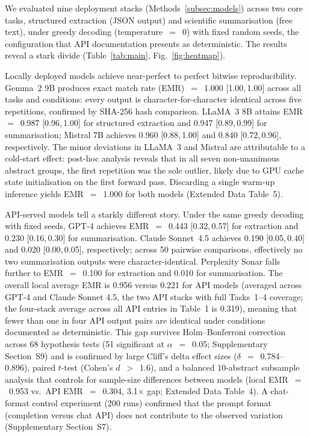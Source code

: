 \documentclass[sn-nature]{sn-jnl}
\begin{document}
We evaluated nine deployment stacks (Methods~\ref{subsec:models}) across two core tasks, structured extraction (JSON output) and scientific summarisation (free text), under greedy decoding (temperature~$=$~0) with fixed random seeds, the configuration that API documentation presents as deterministic.
The results reveal a stark divide (Table~\ref{tab:main}, Fig.~\ref{fig:heatmap}).

Locally deployed models achieve near-perfect to perfect bitwise reproducibility.
Gemma~2 9B produces exact match rate (EMR)~$=$~1.000 [1.00,\,1.00] across all tasks and conditions: every output is character-for-character identical across five repetitions, confirmed by SHA-256 hash comparison.
LLaMA~3 8B attains EMR~$=$~0.987 [0.96,\,1.00] for structured extraction and 0.947 [0.89,\,0.99] for summarisation; Mistral 7B achieves 0.960 [0.88,\,1.00] and 0.840 [0.72,\,0.96], respectively.
The minor deviations in LLaMA~3 and Mistral are attributable to a cold-start effect: post-hoc analysis reveals that in all seven non-unanimous abstract groups, the first repetition was the sole outlier, likely due to GPU cache state initialisation on the first forward pass.
Discarding a single warm-up inference yields EMR~$=$~1.000 for both models (Extended Data Table~5).

API-served models tell a starkly different story.
Under the same greedy decoding with fixed seeds, GPT-4 achieves EMR~$=$~0.443 [0.32,\,0.57] for extraction and 0.230 [0.16,\,0.30] for summarisation.
Claude Sonnet~4.5 achieves 0.190 [0.05,\,0.40] and 0.020 [0.00,\,0.05], respectively; across 50 pairwise comparisons, effectively no two summarisation outputs were character-identical.
Perplexity Sonar falls further to EMR~$=$~0.100 for extraction and 0.010 for summarisation.
The overall local average EMR is 0.956 versus 0.221 for API models (averaged across GPT-4 and Claude Sonnet 4.5, the two API stacks with full Tasks~1--4 coverage; the four-stack average across all API entries in Table~1 is 0.319), meaning that fewer than one in four API output pairs are identical under conditions documented as deterministic.
This gap survives Holm--Bonferroni correction across 68 hypothesis tests (51 significant at $\alpha$~$=$~0.05; Supplementary Section~S9) and is confirmed by large Cliff's delta effect sizes ($\delta$~$=$~0.784--0.896), paired $t$-test (Cohen's $d$~$>$~1.6), and a balanced 10-abstract subsample analysis that controls for sample-size differences between models (local EMR~$=$~0.953 vs.\ API EMR~$=$~0.304, 3.1$\times$ gap; Extended Data Table~4).
A chat-format control experiment (200 runs) confirmed that the prompt format (completion versus chat API) does not contribute to the observed variation (Supplementary Section~S7).
\end{document}
